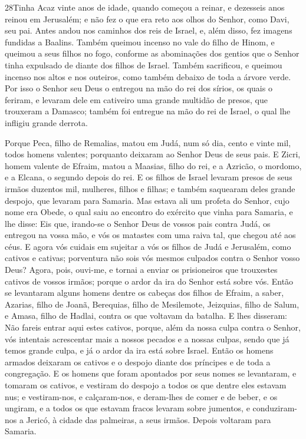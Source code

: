 \medskip

\lettrine{28} Tinha Acaz vinte anos de idade, quando começou a
reinar, e dezesseis anos reinou em Jerusalém; e não fez o que era
reto aos olhos do Senhor, como Davi, seu pai. Antes andou nos
caminhos dos reis de Israel, e, além disso, fez imagens fundidas a
Baalins. Também queimou incenso no vale do filho de Hinom, e
queimou a seus filhos no fogo, conforme as abominações dos gentios
que o Senhor tinha expulsado de diante dos filhos de Israel.
Também sacrificou, e queimou incenso nos altos e nos outeiros,
como também debaixo de toda a árvore verde. Por isso o Senhor
seu Deus o entregou na mão do rei dos sírios, os quais o feriram, e
levaram dele em cativeiro uma grande multidão de presos, que
trouxeram a Damasco; também foi entregue na mão do rei de Israel, o
qual lhe infligiu grande derrota.

Porque Peca, filho de Remalias, matou em Judá, num só dia, cento e
vinte mil, todos homens valentes; porquanto deixaram ao Senhor Deus
de seus pais. E Zicri, homem valente de Efraim, matou a Maasias,
filho do rei, e a Azricão, o mordomo, e a Elcana, o segundo depois
do rei. E os filhos de Israel levaram presos de seus irmãos
duzentos mil, mulheres, filhos e filhas; e também saquearam deles
grande despojo, que levaram para Samaria. Mas estava ali um
profeta do Senhor, cujo nome era Obede, o qual saiu ao encontro do
exército que vinha para Samaria, e lhe disse: Eis que, irando-se o
Senhor Deus de vossos pais contra Judá, os entregou na vossa mão, e
vós os matastes com uma raiva tal, que chegou até aos céus. E
agora vós cuidais em sujeitar a vós os filhos de Judá e Jerusalém,
como cativos e cativas; porventura não sois vós mesmos culpados
contra o Senhor vosso Deus? Agora, pois, ouvi-me, e tornai a
enviar os prisioneiros que trouxestes cativos de vossos irmãos;
porque o ardor da ira do Senhor está sobre vós. Então se
levantaram alguns homens dentre os cabeças dos filhos de Efraim, a
saber, Azarias, filho de Joanã, Berequias, filho de Mesilemote,
Jeizquias, filho de Salum, e Amasa, filho de Hadlai, contra os que
voltavam da batalha. E lhes disseram: Não fareis entrar aqui
estes cativos, porque, além da nossa culpa contra o Senhor, vós
intentais acrescentar mais a nossos pecados e a nossas culpas, sendo
que já temos grande culpa, e já o ardor da ira está sobre Israel.
Então os homens armados deixaram os cativos e o despojo
diante dos príncipes e de toda a congregação. E os homens que
foram apontados por seus nomes se levantaram, e tomaram os cativos,
e vestiram do despojo a todos os que dentre eles estavam nus; e
vestiram-nos, e calçaram-nos, e deram-lhes de comer e de beber, e os
ungiram, e a todos os que estavam fracos levaram sobre jumentos, e
conduziram-nos a Jericó, à cidade das palmeiras, a seus irmãos.
Depois voltaram para Samaria.

